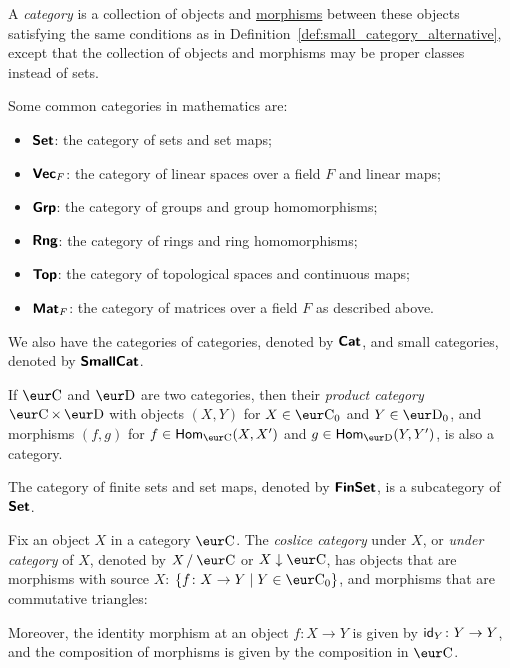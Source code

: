 \begin{definition}[Category]\label{def:category}
  A \emph{category} is a collection of objects and \hyperref[def:morphism]{morphisms} between these objects satisfying the same conditions as in Definition~\ref{def:small_category_alternative}, except that the collection of objects and morphisms may be proper classes instead of sets.
\end{definition}

\begin{example}
  Some common categories in mathematics are:
  \begin{itemize}
    \item $\operatorname{\text{\normalfont\bf\sffamily Set}}$: the category of sets and set maps;
    \item $\operatorname{\text{\normalfont\bf\sffamily Vec}}_F$: the category of linear spaces over a field $F$ and linear maps;
    \item $\text{\normalfont\bf\sffamily Grp}$: the category of groups and group homomorphisms;
    \item $\text{\normalfont\bf\sffamily Rng}$: the category of rings and ring homomorphisms;
    \item $\text{\normalfont\bf\sffamily Top}$: the category of topological spaces and continuous maps;
    \item $\text{\normalfont\bf\sffamily Mat}_F$: the category of matrices over a field $F$ as described above.
  \end{itemize}
  We also have the categories of categories, denoted by $\text{\normalfont\bf\sffamily Cat}$, and small categories, denoted by $\text{\normalfont\bf\sffamily SmallCat}$.
\end{example}

\begin{example}
  If $\Ca$ and $\D$ are two categories, then their \emph{product category} $\Ca \times \D$ with objects $(X, Y)$ for $X \in \Ca_0$ and $Y \in \D_0$, and morphisms $(f, g)$ for $f \in \Hom_{\Ca}(X, X')$ and $g \in \Hom_{\D}(Y, Y')$, is also a category.
\end{example}

\begin{example}
  The category of finite sets and set maps, denoted by $\text{\normalfont\bf\sffamily FinSet}$, is a subcategory of $\operatorname{\text{\normalfont\bf\sffamily Set}}$.
\end{example}

\begin{example}
  Fix an object $X$ in a category $\Ca$. The \emph{coslice category} under $X$, or \emph{under category} of $X$, denoted by $\quotient{X}{\Ca}$ or $X \downarrow \Ca$, has objects that are morphisms with source $X$: $\{ f \colon X \to Y \mid Y \in \Ca_0 \}$, and morphisms that are commutative triangles:
  \begin{center}
  \end{center}
  Moreover, the identity morphism at an object $f \colon X \to Y$ is given by $\operatorname{\text{\normalfont\sffamily id}}_Y \colon Y \to Y$, and the composition of morphisms is given by the composition in $\Ca$.
\end{example}


